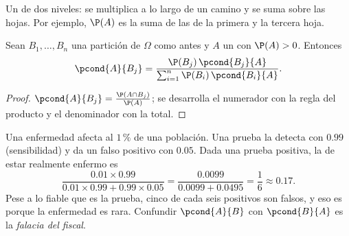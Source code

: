 \begin{omfigure}

{\small Un  de dos niveles: se multiplica a lo largo de un camino y se
suma sobre las hojas. Por ejemplo, $\P(A)$ es la suma de las
 de la primera y la tercera hoja.}
\end{omfigure}

\begin{theorem}\label{thm:g12:condprob:bayes}
Sean $B_1, \dots, B_n$ una partición de $\Omega$ como antes y $A$ un 
con $\P(A) > 0$. Entonces
\[
\pcond{A}{B_j} =
\frac{\P(B_j)\,\pcond{B_j}{A}}{\sum_{i=1}^{n} \P(B_i)\,\pcond{B_i}{A}} .
\]
\end{theorem}

\begin{proof}
$\pcond{A}{B_j} = \frac{\P(A \cap B_j)}{\P(A)}$; se desarrolla el numerador
con la regla del producto y el denominador con la  total.
\end{proof}

\begin{example}\label{ex:g12:condprob:test}
Una enfermedad afecta al $1\,\%$ de una población. Una prueba la detecta
con  $0.99$ (sensibilidad) y da un falso positivo con
 $0.05$. Dada una prueba positiva, la  de estar
realmente enfermo es
\[
\frac{0.01 \times 0.99}{0.01\times0.99 + 0.99\times0.05}
= \frac{0.0099}{0.0099 + 0.0495} = \frac{1}{6} \approx 0.17 .
\]
Pese a lo fiable que es la prueba, cinco de cada seis positivos son falsos,
y eso es porque la enfermedad es rara. Confundir $\pcond{A}{B}$ con
$\pcond{B}{A}$ es la \emph{falacia del fiscal}.
\end{example}

